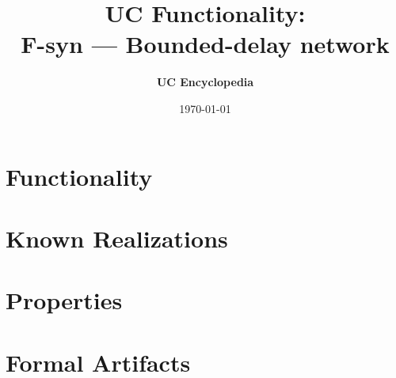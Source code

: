 \documentclass[11pt,a4paper]{article}
\title{\textbf{\Large UC Functionality:}\\[0.2em] \Large F-syn --- Bounded-delay network}
\author{\textbf{UC Encyclopedia}}
\date{\today}
\newtheorem{functionality}{Functionality}
\begin{document}
\maketitle

\begin{abstract}
\end{abstract}

\section{Functionality}

%

\section{Known Realizations}


\section{Properties}


\section{Formal Artifacts}

\end{document}
